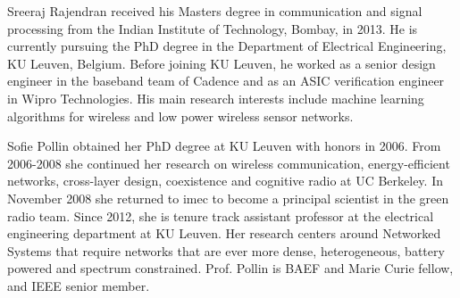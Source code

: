\begin{IEEEbiography}
    {Sreeraj Rajendran}
received his Masters degree in communication and signal processing from the Indian Institute of Technology, Bombay, in 2013. He is currently pursuing the PhD degree in the Department of Electrical Engineering, KU Leuven, Belgium. Before joining KU Leuven, he worked as a senior design engineer in the baseband team of Cadence and as an ASIC verification engineer in Wipro Technologies. His main research interests include machine learning algorithms for wireless and low power wireless sensor networks.
\end{IEEEbiography}


\begin{IEEEbiography}
    {Sofie Pollin}
obtained her PhD degree at KU Leuven with honors in 2006. From 2006-2008 she continued her research on wireless communication, energy-efficient networks, cross-layer design, coexistence and cognitive radio at UC Berkeley.  In November 2008 she returned to imec to become a principal scientist in the green radio team. Since 2012, she is tenure track assistant professor at the electrical engineering department at KU Leuven. Her research centers around Networked Systems that require networks that are ever more dense, heterogeneous, battery powered and spectrum constrained. Prof. Pollin is BAEF and Marie Curie fellow, and IEEE senior member. 
\end{IEEEbiography}